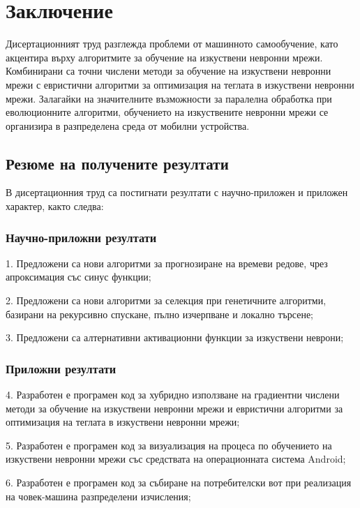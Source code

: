 \chapter*{Заключение}

Дисертационният труд разглежда проблеми от машинното самообучение, като акцентира върху алгоритмите за обучение на изкуствени невронни мрежи. Комбинирани са точни числени методи за обучение на изкуствени невронни мрежи с евристични алгоритми за оптимизация на теглата в изкуствени невронни мрежи. Залагайки на значителните възможности за паралелна обработка при еволюционните алгоритми, обучението на изкуствените невронни мрежи се организира в разпределена среда от мобилни устройства.

\section*{Резюме на получените резултати}

В дисертационния труд са постигнати резултати с научно-приложен и приложен характер, както следва:

\subsection*{Научно-приложни резултати}

\begin{description}
\item 1. Предложени са нови алгоритми за прогнозиране на времеви редове, чрез апроксимация със синус функции;
\item 2. Предложени са нови алгоритми за селекция при генетичните алгоритми, базирани на рекурсивно спускане, пълно изчерпване и локално търсене;
\item 3. Предложени са алтернативни активационни функции за изкуствени неврони;
\end{description}

\subsection*{Приложни резултати}

\begin{description}
\item 4. Разработен е програмен код за хубридно използване на градиентни числени методи за обучение на изкуствени невронни мрежи и евристични алгоритми за оптимизация на теглата в изкуствени невронни мрежи;
\item 5. Разработен е програмен код за визуализация на процеса по обучението на изкуствени невронни мрежи със средствата на операционната система Android;
\item 6. Разработен е програмен код за събиране на потребителски вот при реализация на човек-машина разпределени изчисления;
\end{description}

